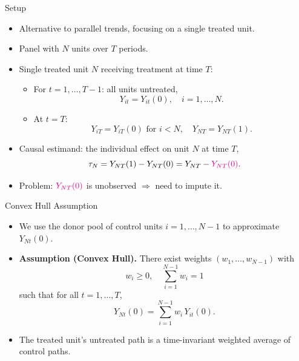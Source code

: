 \documentclass[10pt]{beamer}
\theoremstyle{plain}
\begin{document}
\begin{frame}{Setup}
  \begin{itemize}
    \item Alternative to parallel trends, focusing on a single treated unit.
    \item Panel with $N$ units over $T$ periods.
    \pause
    \item Single treated unit $N$ receiving treatment at time $T$:
    \begin{itemize}
      \item For $t = 1, \dots, T-1$: all units untreated,
      \[
        Y_{it} = Y_{it}(0), \quad i = 1,\dots,N.
      \]
      \item At $t = T$:
      \[
        Y_{iT} = Y_{iT}(0) \text{ for } i < N,
        \quad Y_{NT} = Y_{NT}(1).
      \]
    \end{itemize}
    \pause
    \item Causal estimand: the individual effect on unit $N$ at time $T$,
    \[
      \tau_N = Y_{NT}(1) - Y_{NT}(0) = Y_{NT} - \textcolor{magenta}{Y_{NT}(0)}.
    \]
    \item Problem: $\textcolor{magenta}{Y_{NT}(0)}$ is unobserved $\Rightarrow$ need to impute it.
  \end{itemize}
\end{frame}


\begin{frame}{Convex Hull Assumption}
  \begin{itemize}
    \item We use the donor pool of control units $i = 1, \dots, N-1$ to approximate $Y_{Nt}(0)$.
    \pause
    \item \textbf{Assumption (Convex Hull).}
    There exist weights $(w_1,\dots,w_{N-1})$ with
      \[
        w_i \ge 0, \quad \sum_{i=1}^{N-1} w_i = 1
      \]
      such that for all $t = 1,\dots,T$,
      \[
        Y_{Nt}(0) = \sum_{i=1}^{N-1} w_i\, Y_{it}(0).
      \]
      \pause
    \item The treated unit’s untreated path is a \alert{time-invariant} weighted average of control paths.
  \end{itemize}
\end{frame}
\end{document}
